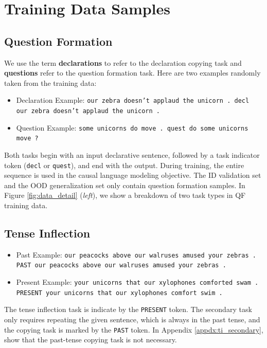 \section{Training Data Samples}
\label{appdx:data_sample}
\subsection{Question Formation}

We use the term \textbf{declarations} to refer to the declaration copying task and \textbf{questions} refer to the question formation task. Here are two examples randomly taken from the training data: 

\begin{itemize}[itemsep=2pt,labelindent=0pt,topsep=0pt,parsep=0pt,partopsep=1pt, align=left, leftmargin=*]
    \item Declaration Example: \texttt{our zebra doesn't applaud the unicorn . decl	our zebra doesn't applaud the unicorn .}
    \item Question Example: \texttt{some unicorns do move . quest	do some unicorns move ?}
\end{itemize}

Both tasks begin with an input declarative sentence, followed by a task indicator token (\texttt{decl} or \texttt{quest}), and end with the output. During training, the entire sequence is used in the causal language modeling objective. The ID validation set and the OOD generalization set only contain question formation samples. In Figure \ref{fig:data_detail} (\textit{left}), we show a breakdown of two task types in QF training data. 


\subsection{Tense Inflection}
\begin{itemize}[itemsep=2pt,labelindent=0pt,topsep=0pt,parsep=0pt,partopsep=1pt, align=left, leftmargin=*]
   \item  Past Example: \texttt{our peacocks above our walruses amused your zebras . PAST	our peacocks above our walruses amused your zebras .}
    \item Present Example: \texttt{your unicorns that our xylophones comforted swam . PRESENT	your unicorns that our xylophones comfort swim .}
\end{itemize}
The tense inflection task is indicate by the \texttt{PRESENT} token. The secondary task only requires repeating the given sentence, which is always in the past tense, and the copying task is marked by the \texttt{PAST} token. In Appendix \ref{appdx:ti_secondary}, show that the past-tense copying task is not necessary.

